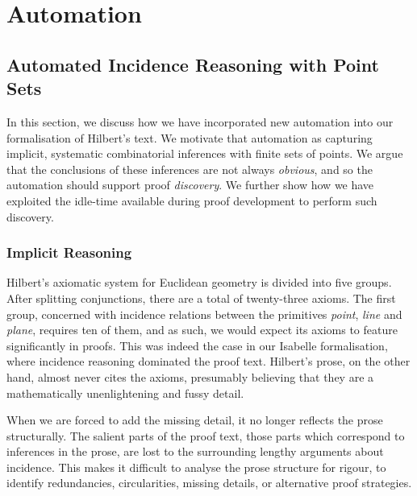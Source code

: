 \chapter{Automation}\label{chapter:Automation}
\section{Automated Incidence Reasoning with Point Sets}\label{sec:Incidence} 
In this section, we discuss how we have incorporated new automation into our formalisation of Hilbert's text. We motivate that automation as capturing implicit, systematic combinatorial inferences with finite sets of points. We argue that the conclusions of these inferences are not always \emph{obvious}, and so the automation should support proof \emph{discovery}. We further show how we have exploited the idle-time available during proof development to perform such discovery.

\subsection{Implicit Reasoning}
Hilbert's axiomatic system for Euclidean geometry is divided into five groups. After splitting conjunctions, there are a total of twenty-three axioms. The first group, concerned with incidence relations between the primitives \emph{point}, \emph{line} and \emph{plane}, requires ten of them, and as such, we would expect its axioms to feature significantly in proofs. This was indeed the case in our Isabelle formalisation, where incidence reasoning dominated the proof text. Hilbert's prose, on the other hand, almost never cites the axioms, presumably believing that they are a mathematically unenlightening and fussy detail.

When we are forced to add the missing detail, it no longer reflects the prose structurally. The salient parts of the proof text, those parts which correspond to inferences in the prose, are lost to the surrounding lengthy arguments about incidence. This makes it difficult to analyse the prose structure for rigour, to identify redundancies, circularities, missing details, or alternative proof strategies.

